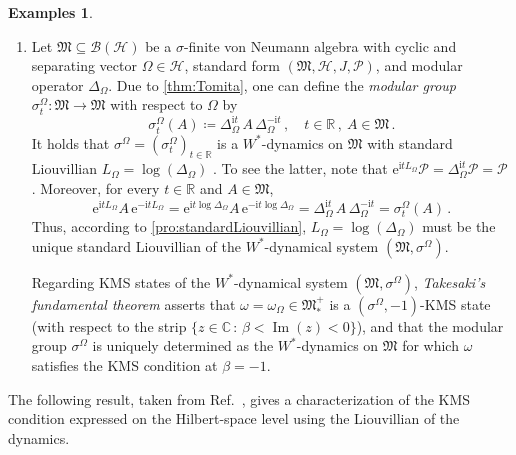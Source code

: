 \documentclass[a4paper, twoside, 11pt, reqno]{amsart}
\theoremstyle{definition}
\newtheorem{examples}[definition]{Examples}
\theoremstyle{plain}
\renewcommand{\subset}{\subseteq}
\renewcommand{\Im}{\operatorname{Im}}
\renewcommand{\Delta}{\varDelta}
\renewcommand{\Omega}{\varOmega}
\newcommand{\R}{\mathbb{R}}
\newcommand{\C}{\mathbb{C}}
\newcommand{\MH}{\mathcal{H}}
\newcommand{\MFM}{\mathfrak{M}}
\newcommand{\ii}{\mathrm{i}}
\newcommand{\ee}{\mathrm{e}}
\newcommand{\BO}{\mathscr{B}}
\newcommand{\NF}[1]{#1_{\ast}^{+}}
\newcommand{\NPC}{\mathcal{P}}
\newcommand{\1}{\mathbf{1}}
\newcommand{\set}[2][]{#1\{{#2}#1\}}
\newcommand{\ce}{\coloneqq}
\begin{document}
\begin{examples}
\begin{enumerate}[env]
        \item \label{enu:modularGroup} Let $\MFM \subset \BO(\MH)$ be a $\sigma$-finite von Neumann algebra with cyclic and separating vector $\Omega \in \MH$, standard form $(\MFM, \MH, J, \NPC)$, and modular operator $\Delta_\Omega$. Due to \cref{thm:Tomita}, one can define the \emph{modular group} $\sigma_t^\Omega : \MFM \to \MFM$ with respect to $\Omega$ by
        \begin{equation*}
            \sigma_t^\Omega (A) \ce \Delta_\Omega^{\ii t} \, A \, \Delta_\Omega^{- \ii t} \, , \quad t \in \R \, , \ A \in \MFM \, .
        \end{equation*}
        It holds that $\sigma^\Omega = (\sigma_t^\Omega)_{t \in \R}$ is a $W^\ast$-dynamics on $\MFM$ with standard Liouvillian $L_\Omega = \log(\Delta_\Omega)$ \cite[Thm. 2.4 (4)]{DJP03}. To see the latter, note that $\ee^{\ii t L_\Omega} \NPC = \Delta_\Omega^{\ii t} \NPC = \NPC$ \cite[Thm. 3.2 (iii)]{Hiai2021}. Moreover, for every $t \in \R$ and $A \in \MFM$,
        \begin{equation*}
            \ee^{\ii t L_\Omega} A \, \ee^{- \ii t L_\Omega} = \ee^{\ii t \log \Delta_\Omega} A \, \ee^{- \ii t \log \Delta_\Omega} = \Delta_\Omega^{\ii t} \, A \, \Delta_\Omega^{- \ii t} = \sigma_t^\Omega (A) \, .
        \end{equation*}
        Thus, according to \cref{pro:standardLiouvillian}, $L_\Omega = \log(\Delta_\Omega)$ must be the unique standard Liouvillian of the $W^\ast$-dynamical system $(\MFM, \sigma^\Omega)$.

        Regarding KMS states of the $W^\ast$-dynamical system $(\MFM, \sigma^\Omega)$, \emph{Takesaki's fundamental theorem} \cite[Thm. 2.14]{Hiai2021} asserts that $\omega = \omega_\Omega \in \NF{\MFM}$ is a $(\sigma^\Omega, -1)$-KMS state (with respect to the strip $\set{z \in \C \, : \, \beta < \Im(z) < 0}$), and that the modular group $\sigma^\Omega$ is uniquely determined as the $W^\ast$-dynamics on $\MFM$ for which $\omega$ satisfies the KMS condition at $\beta = - 1$.
    \end{enumerate}
\end{examples}

The following result, taken from Ref.~\cite[Thm. 2.13]{DJP03}, gives a characterization of the KMS condition expressed on the Hilbert-space level using the Liouvillian of the dynamics.
\end{document}

